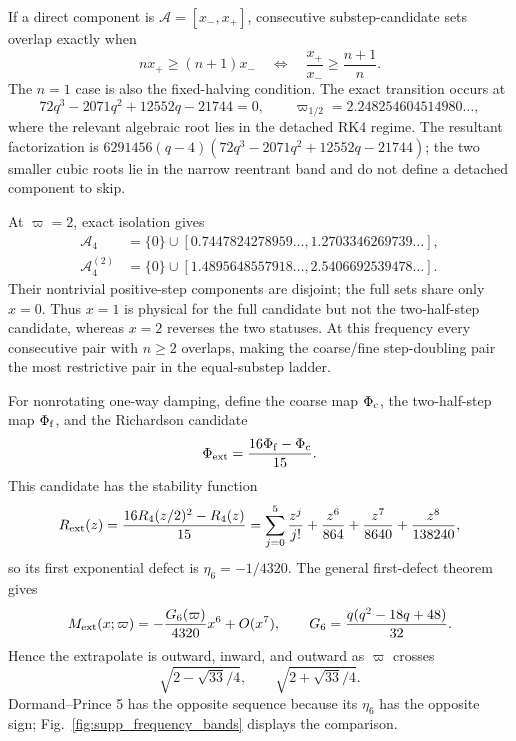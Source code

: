 \documentclass[11pt]{article}
\begin{document}
If a direct component is $\mathcal A=[x_-,x_+]$, consecutive substep-candidate sets overlap exactly when
\begin{equation}
 n x_+\ge(n+1)x_-
 \quad\Longleftrightarrow\quad
 \frac{x_+}{x_-}\ge\frac{n+1}{n}.
\end{equation}
The $n=1$ case is also the fixed-halving condition. The exact transition occurs at
\begin{equation}
 72q^3-2071q^2+12552q-21744=0,
 \qquad
 \varpi_{1/2}=2.248254604514980\ldots,
\end{equation}
where the relevant algebraic root lies in the detached RK4 regime. The resultant factorization is $6291456(q-4)(72q^3-2071q^2+12552q-21744)$; the two smaller cubic roots lie in the narrow reentrant band and do not define a detached component to skip.

At $\varpi=2$, exact isolation gives
\begin{align}
 \mathcal A_4&=\{0\}\cup[0.7447824278959\ldots,1.2703346269739\ldots],\\
 \mathcal A_4^{(2)}&=\{0\}\cup[1.4895648557918\ldots,2.5406692539478\ldots].
\end{align}
Their nontrivial positive-step components are disjoint; the full sets share only $x=0$. Thus $x=1$ is physical for the full candidate but not the two-half-step candidate, whereas $x=2$ reverses the two statuses. At this frequency every consecutive pair with $n\ge2$ overlaps, making the coarse/fine step-doubling pair the most restrictive pair in the equal-substep ladder.

For nonrotating one-way damping, define the coarse map $\Phi_{\rm c}$, the two-half-step map $\Phi_{\rm f}$, and the Richardson candidate
\begin{equation}
 \Phi_{\rm ext}=\frac{16\Phi_{\rm f}-\Phi_{\rm c}}{15}.
\end{equation}
This candidate has the stability function
\begin{equation}
 R_{\rm ext}(z)=\frac{16R_4(z/2)^2-R_4(z)}{15}
 =\sum_{j=0}^{5}\frac{z^j}{j!}+\frac{z^6}{864}+\frac{z^7}{8640}+\frac{z^8}{138240},
\end{equation}
so its first exponential defect is $\eta_6=-1/4320$. The general first-defect theorem gives
\begin{equation}
 M_{\rm ext}(x;\varpi)=-\frac{G_6(\varpi)}{4320}x^6+O(x^7),
 \qquad
 G_6=\frac{q(q^2-18q+48)}{32}.
\end{equation}
Hence the extrapolate is outward, inward, and outward as $\varpi$ crosses
\begin{equation}
 \sqrt{2-\sqrt{33}/4},\qquad \sqrt{2+\sqrt{33}/4}.
\end{equation}
Dormand--Prince 5 has the opposite sequence because its $\eta_6$ has the opposite sign; Fig.~\ref{fig:supp_frequency_bands} displays the comparison.
\end{document}
